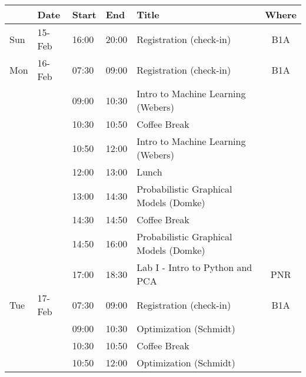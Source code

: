 \begin{longtable}{  p{0.5cm} l l l p{9cm}  c    }
\toprule
 & \textbf{Date}   & \textbf{Start} & \textbf{End}   & \textbf{Title}                                                             & \textbf{Where}             \\
\toprule
Sun & 15-Feb & 16:00 & 20:00 & Registration (check-in)                                           &B1A \\
\midrule
Mon & 16-Feb & 07:30 & 09:00 & Registration (check-in)                                           &B1A \\
    &        & 09:00 & 10:30 & Intro to Machine Learning  (Webers)                               &                   \\
    &        & 10:30 & 10:50 & Coffee Break                                                      &                   \\
    &        & 10:50 & 12:00 & Intro to Machine Learning  (Webers)                               &                   \\
    &        & 12:00 & 13:00 & Lunch                                                             &                   \\
    &        & 13:00 & 14:30 & Probabilistic Graphical Models (Domke)                            &                   \\
    &        & 14:30 & 14:50 & Coffee Break                                                      &                   \\
    &        & 14:50 & 16:00 & Probabilistic Graphical Models (Domke)                            &                   \\
    &        & 17:00 & 18:30 & Lab I - Intro to Python and PCA                                   & PNR      \\
\midrule
Tue & 17-Feb & 07:30 & 09:00 & Registration (check-in)                                           &B1A \\
    &        & 09:00 & 10:30 & Optimization (Schmidt)                                            &                   \\
    &        & 10:30 & 10:50 & Coffee Break                                                      &                   \\
    &        & 10:50 & 12:00 & Optimization (Schmidt)                                            &                   \\

\end{longtable}
